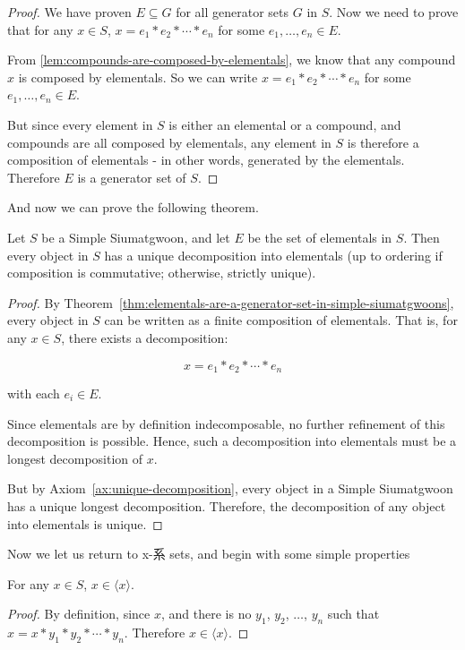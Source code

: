 \begin{proof}
    We have proven $E\subseteq G$ for all generator sets $G$ in $S$. Now we need to prove that for any $x\in S$, $x = e_1 * e_2 * \cdots * e_n$ for some $e_1, \dots, e_n \in E$.

    From \ref{lem:compounds-are-composed-by-elementals}, we know that any compound $x$ is composed by elementals. So we can write $x = e_1 * e_2 * \cdots * e_n$ for some $e_1, \dots, e_n \in E$.

    But since every element in $S$ is either an elemental or a compound, and compounds are all composed by elementals, any element in $S$ is therefore a composition of elementals - in other words, generated by the elementals. Therefore $E$ is a generator set of $S$.
\end{proof}


And now we can prove the following theorem.
    
\begin{theorem}\label{thm:elementals-unique-decomposition}
    Let $S$ be a Simple Siumatgwoon, and let $E$ be the set of elementals in $S$. Then every object in $S$ has a unique decomposition into elementals (up to ordering if composition is commutative; otherwise, strictly unique).
\end{theorem}
    
\begin{proof}
    By Theorem~\ref{thm:elementals-are-a-generator-set-in-simple-siumatgwoons}, every object in $S$ can be written as a finite composition of elementals. That is, for any $x \in S$, there exists a decomposition:
    
    $$x = e_1 * e_2 * \cdots * e_n$$
    
    with each $e_i \in E$.
    
    Since elementals are by definition indecomposable, no further refinement of this decomposition is possible. Hence, such a decomposition into elementals must be a longest decomposition of $x$.

    But by Axiom~\ref{ax:unique-decomposition}, every object in a Simple Siumatgwoon has a unique longest decomposition. Therefore, the decomposition of any object into elementals is unique.
\end{proof}
    
Now we let us return to x-系 sets, and begin with some simple properties

\begin{lemma}\label{lem:an-object-is-in-its-own-emergence-set}
    For any $x\in S$, $x \in \langle x \rangle$.
\end{lemma}
\begin{proof}
    By definition, since $x$, and there is no $y_1$, $y_2$, $\ldots$, $y_n$ such that $x=x*y_1*y_2*\cdots*y_n$. Therefore $x \in \langle x \rangle$.
\end{proof}



